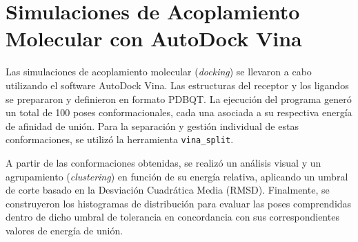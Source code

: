 \section{Simulaciones de Acoplamiento Molecular con AutoDock Vina}
Las simulaciones de acoplamiento molecular (\textit{docking}) se llevaron a cabo utilizando el software AutoDock Vina. Las estructuras del receptor y los ligandos se prepararon y definieron en formato PDBQT. La ejecución del programa generó un total de 100 poses conformacionales, cada una asociada a su respectiva energía de afinidad de unión. Para la separación y gestión individual de estas conformaciones, se utilizó la herramienta \texttt{vina\_split}.

A partir de las conformaciones obtenidas, se realizó un análisis visual y un agrupamiento (\textit{clustering}) en función de su energía relativa, aplicando un umbral de corte basado en la Desviación Cuadrática Media (RMSD). Finalmente, se construyeron los histogramas de distribución para evaluar las poses comprendidas dentro de dicho umbral de tolerancia en concordancia con sus correspondientes valores de energía de unión.


